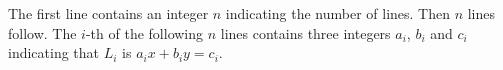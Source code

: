 The first line contains an integer $n$ indicating the number of lines.
Then $n$ lines follow.
The $i$-th of the following $n$ lines contains three integers $a_i$, $b_i$
and $c_i$ indicating that $L_i$ is $a_ix+b_iy=c_i$. 
